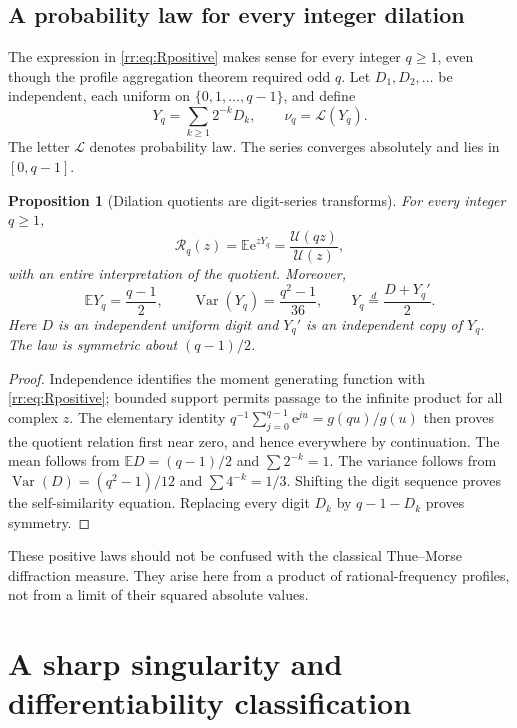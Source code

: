 \documentclass[11pt,a4paper,oneside,openany]{book}
\numberwithin{equation}{chapter}
\newtheorem{proposition}[theorem]{Proposition}
\theoremstyle{definition}
\theoremstyle{remark}
\newcommand{\E}{\mathbb E}
\newcommand{\e}{\mathrm e}
\newcommand{\Up}{\mathcal U}
\newcommand{\Rp}{\mathcal R}
\begin{document}
\section{A probability law for every integer dilation}
The expression in \eqref{rr:eq:Rpositive} makes sense for every integer \(q\geq1\), even though the profile aggregation theorem required odd \(q\). Let \(D_1,D_2,\ldots\) be independent, each uniform on \(\{0,1,\ldots,q-1\}\), and define
\begin{equation}
 Y_q=\sum_{k\geq1}2^{-k}D_k,\qquad \nu_q=\mathcal L(Y_q).
 \label{rr:eq:Yq}
\end{equation}
The letter \(\mathcal L\) denotes probability law. The series converges absolutely and lies in \([0,q-1]\).

\begin{proposition}[Dilation quotients are digit-series transforms]
For every integer \(q\geq1\),
\begin{equation}
 \Rp_q(z)=\E\e^{zY_q}=\frac{\Up(qz)}{\Up(z)},
 \label{rr:eq:digittransform}
\end{equation}
with an entire interpretation of the quotient. Moreover,
\begin{equation}
 \E Y_q=\frac{q-1}{2},\qquad
 \operatorname{Var}(Y_q)=\frac{q^2-1}{36},\qquad
 Y_q\overset d=\frac{D+Y_q'}2.
 \label{rr:eq:Ymoments}
\end{equation}
Here \(D\) is an independent uniform digit and \(Y_q'\) is an independent copy of \(Y_q\). The law is symmetric about \((q-1)/2\).
\end{proposition}
\begin{proof}
Independence identifies the moment generating function with \eqref{rr:eq:Rpositive}; bounded support permits passage to the infinite product for all complex \(z\). The elementary identity
\(q^{-1}\sum_{j=0}^{q-1}\e^{ju}=g(qu)/g(u)\)
then proves the quotient relation first near zero, and hence everywhere by continuation. The mean follows from \(\E D=(q-1)/2\) and \(\sum2^{-k}=1\). The variance follows from \(\operatorname{Var}(D)=(q^2-1)/12\) and \(\sum4^{-k}=1/3\). Shifting the digit sequence proves the self-similarity equation. Replacing every digit \(D_k\) by \(q-1-D_k\) proves symmetry.
\end{proof}
These positive laws should not be confused with the classical Thue--Morse diffraction measure. They arise here from a product of rational-frequency profiles, not from a limit of their squared absolute values.
\chapter{A sharp singularity and differentiability classification}
\label{rr:sec:regularity}
\end{document}
